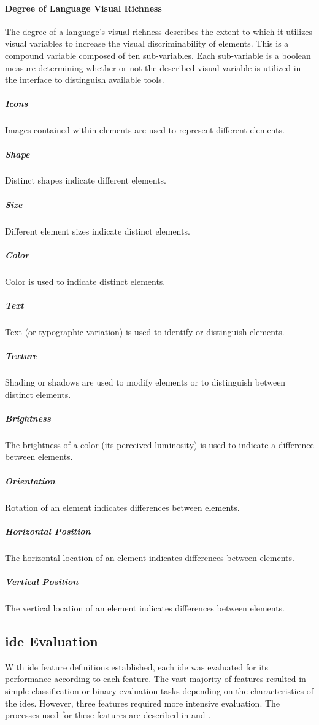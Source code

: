 \paragraph{Degree of Language Visual Richness} The degree of a language's
visual richness describes the extent to which it utilizes visual
variables to increase the visual discriminability of elements. This
is a compound variable composed of ten sub-variables. Each sub-variable
is a boolean measure determining whether or not the described visual
variable is utilized in the interface to distinguish available tools.

\subparagraph{Icons} Images contained within elements are used to represent
different elements.~\cite{costagliola2002,moody2009}

\subparagraph{Shape} Distinct shapes indicate different elements.
\cite{moody2009}

\subparagraph{Size} Different element sizes indicate distinct elements.
\cite{moody2009}

\subparagraph{Color} Color is used to indicate distinct elements.
\cite{moody2009}

\subparagraph{Text} Text (or typographic variation) is used to identify or
distinguish elements.~\cite{moody2009}

\subparagraph{Texture} Shading or shadows are used to modify elements or to
distinguish between distinct elements.~\cite{moody2009}

\subparagraph{Brightness} The brightness of a color (\ie its perceived
luminosity) is used to indicate a difference between elements.
\cite{moody2009}

\subparagraph{Orientation} Rotation of an element indicates differences
between elements.~\cite{moody2009}

\subparagraph{Horizontal Position} The horizontal location of an element
indicates differences between elements.~\cite{moody2009}

\subparagraph{Vertical Position} The vertical location of an element
indicates differences between elements.~\cite{moody2009}


\subsection{\acs{ide} Evaluation} \label{subsec:ideevaluation}

With \ac{ide} feature definitions established, each \ac{ide} was evaluated
for its performance according to each feature. The vast majority of
features resulted in simple classification or binary evaluation tasks
depending on the characteristics of the \acp{ide}. However, three features
required more intensive evaluation. The processes used for these features
are described in  and .

